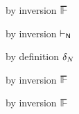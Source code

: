 {\begin{lamportproof*}
    \begin{pfproof}
        \begin{pfproof}
          by inversion $\sWSOP$
        \end{pfproof}
        \begin{pfproof}
          by inversion $\vdash_{\mathsf{N}}$
        \end{pfproof}
      \qedstep
        \begin{pfproof}
          by definition $\delta_{N}$
        \end{pfproof}
    \end{pfproof}

    \begin{pfproof}
      \qedstep
        \begin{pfproof}
          by inversion $\sWSOP$
        \end{pfproof}
    \end{pfproof}

    \begin{pfproof}
      \qedstep
        \begin{pfproof}
          by inversion $\sWSOP$
        \end{pfproof}
    \end{pfproof}

\end{lamportproof*}}

